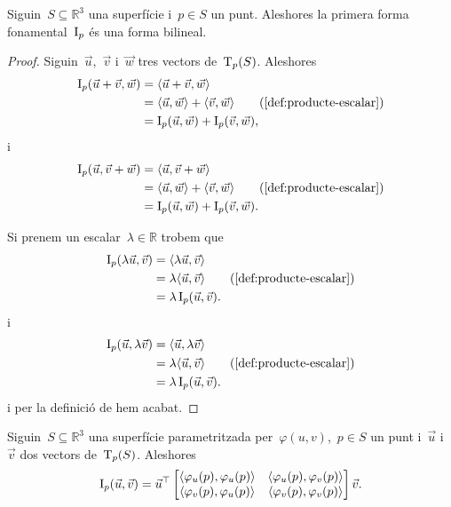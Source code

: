 \documentclass[../geometria-diferencial.tex]{subfiles}
\begin{document}
    \begin{proposition}
        \label{prop:la-primera-forma-fonamental-es-una-forma-bilineal}
        Siguin~\(S\subseteq\mathbb{R}^{3}\) una superfície i~\(p\in S\) un punt.
        Aleshores la primera forma fonamental~\(\I_{p}\) és una forma bilineal.
    \end{proposition}
    \begin{proof}
        Siguin~\(\vec{u}\),~\(\vec{v}\) i~\(\vec{w}\) tres vectors de~\(\operatorname{T}_{p}(S)\).
        Aleshores
        \begin{align*}
            \I_{p}(\vec{u}+\vec{v},\vec{w})&=\prodesc{\vec{u}+\vec{v}}{\vec{w}} \\
            &=\prodesc{\vec{u}}{\vec{w}}+\prodesc{\vec{v}}{\vec{w}} \tag{\ref{def:producte-escalar}}\\
            &=\I_{p}(\vec{u},\vec{w})+\I_{p}(\vec{v},\vec{w}),
        \end{align*}
        i
        \begin{align*}
            \I_{p}(\vec{u},\vec{v}+\vec{w})&=\prodesc{\vec{u}}{\vec{v}+\vec{w}} \\
            &=\prodesc{\vec{u}}{\vec{w}}+\prodesc{\vec{v}}{\vec{w}} \tag{\ref{def:producte-escalar}}\\
            &=\I_{p}(\vec{u},\vec{w})+\I_{p}(\vec{v},\vec{w}).
        \end{align*}

        Si prenem un escalar~\(\lambda\in\mathbb{R}\) trobem que
        \begin{align*}
            \I_{p}(\lambda\vec{u},\vec{v})&=\prodesc{\lambda\vec{u}}{\vec{v}} \\
            &=\lambda\prodesc{\vec{u}}{\vec{v}} \tag{\ref{def:producte-escalar}}\\
            &=\lambda\I_{p}(\vec{u},\vec{v}).
        \end{align*}
        i
        \begin{align*}
            \I_{p}(\vec{u},\lambda\vec{v})&=\prodesc{\vec{u}}{\lambda\vec{v}} \\
            &=\lambda\prodesc{\vec{u}}{\vec{v}} \tag{\ref{def:producte-escalar}}\\
            &=\lambda\I_{p}(\vec{u},\vec{v}).
        \end{align*}
        i per la definició de  hem acabat.
    \end{proof}
    \begin{proposition}
        \label{prop:coeficients-de-la-primera-forma-fonamental}
        Siguin~\(S\subseteq\mathbb{R}^{3}\) una superfície parametritzada per~\(\varphi(u,v)\),~\(p\in S\) un punt i~\(\vec{u}\) i~\(\vec{v}\) dos vectors de~\(\operatorname{T}_{p}(S)\).
        Aleshores
        \[\I_{p}(\vec{u},\vec{v})=\vec{u}^{\transposta}\begin{bmatrix}
            \prodesc{\varphi_{u}(p)}{\varphi_{u}(p)} & \prodesc{\varphi_{u}(p)}{\varphi_{v}(p)} \\
            \prodesc{\varphi_{v}(p)}{\varphi_{u}(p)} & \prodesc{\varphi_{v}(p)}{\varphi_{v}(p)}
        \end{bmatrix}\vec{v}.\]
    \end{proposition}
\end{document}
